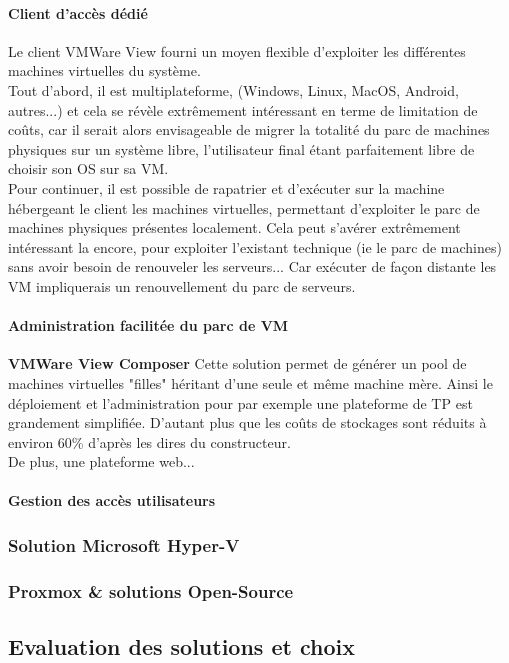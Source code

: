 \paragraph{Client d'accès dédié}
Le client VMWare View fourni un moyen flexible d'exploiter les différentes machines virtuelles du système.\\
Tout d'abord, il est multiplateforme, (Windows, Linux, MacOS, Android, autres...) et cela se révèle extrêmement intéressant en terme de limitation de coûts, car il serait alors envisageable de migrer la totalité du parc de machines physiques  sur un système libre, l'utilisateur final étant parfaitement libre de choisir son OS sur sa VM.\\ 
Pour continuer, il est possible de rapatrier et d'exécuter sur la machine hébergeant le client les machines virtuelles, permettant d'exploiter le parc de machines physiques présentes localement. Cela peut s'avérer extrêmement intéressant la encore, pour exploiter l'existant technique (ie le parc de machines) sans avoir besoin de renouveler les serveurs... Car exécuter de façon distante les VM impliquerais un renouvellement du parc de serveurs.\\

\paragraph{Administration facilitée du parc de VM}
\textbf{VMWare View Composer} Cette solution permet de générer un pool de machines virtuelles "filles" héritant d'une seule et même machine mère. Ainsi le déploiement et l'administration pour par exemple une plateforme de TP est grandement simplifiée. D'autant plus que les coûts de stockages sont réduits à environ 60\% d'après les dires du constructeur.\\
De plus, une plateforme web...%

\paragraph{Gestion des accès utilisateurs}


\subsubsection{Solution Microsoft Hyper-V}

\subsubsection{Proxmox \& solutions Open-Source}


\subsection{Evaluation des solutions et choix}